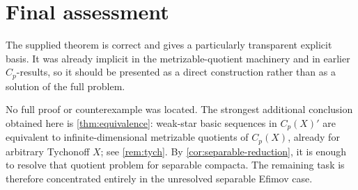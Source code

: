 \documentclass[11pt]{article}
\newcommand{\Cp}{C_p}
\begin{document}
\section{Final assessment}

The supplied theorem is correct and gives a particularly transparent explicit
basis.  It was already implicit in the metrizable-quotient machinery and in
earlier $\Cp$-results, so it should be presented as a direct construction rather
than as a solution of the full problem.

No full proof or counterexample was located.  The strongest additional
conclusion obtained here is \cref{thm:equivalence}: weak-star basic sequences
in $\Cp(X)'$ are equivalent to infinite-dimensional metrizable quotients of
$\Cp(X)$, already for arbitrary Tychonoff $X$; see \cref{rem:tych}.  By \cref{cor:separable-reduction}, it is enough to
resolve that quotient problem for separable compacta.  The remaining task is
therefore concentrated entirely in the unresolved separable Efimov case.
\end{document}
